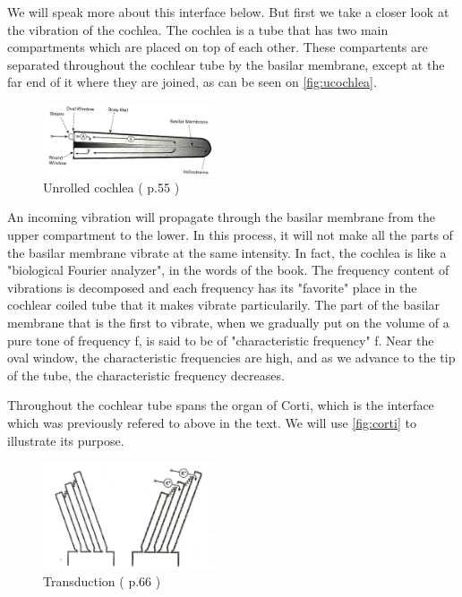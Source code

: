 We will speak more about this interface below. But first we take a closer 
look at the vibration of the cochlea. 
The cochlea is a tube that has two main compartments which are placed on top of 
each other. 
These compartents are separated throughout the cochlear tube by  
the basilar membrane, except at the far end of it where they are joined, 
as can be seen on \autoref{fig:ucochlea}.


\begin{figure}[h]
	\centering
	\includegraphics[width=0.45\textwidth]{images/cochlea-aud55-level.jpg}
	\caption{Unrolled cochlea (\cite{AuditoryNeuroscience} p.55 )}
	\label{fig:ucochlea}
\end{figure}


An incoming vibration will propagate through the basilar membrane from 
the upper compartment to the lower. In this process, it will not make all 
the parts of the basilar membrane vibrate at the same intensity. 
In fact, the cochlea is like a "biological Fourier analyzer", in the words of the book.
The frequency content of vibrations is decomposed and each frequency has its 
"favorite" place in the cochlear coiled tube that it makes vibrate particularily. 
The part of the basilar membrane that is the first to vibrate, 
when we gradually put on the volume of a pure tone of frequency f, is said to be of 
"characteristic frequency" f. Near the oval window, the characteristic 
frequencies are high, and as we advance to the tip of the tube, 
the characteristic frequency decreases.

Throughout the cochlear tube spans the organ of Corti, which is the interface
which was previously refered to above in the text. 
We will use \autoref{fig:corti} to illustrate its purpose.


\begin{figure}[h]
	\centering
  \includegraphics[width=0.45\textwidth]{images/hctransd-aud66-level.jpg}
	\caption{Transduction (\cite{AuditoryNeuroscience} p.66 )}
	\label{fig:transd}
\end{figure}

